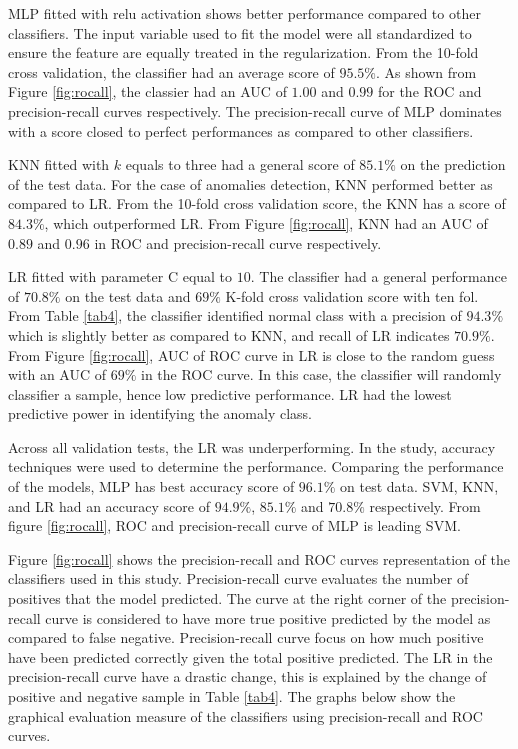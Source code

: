 \documentclass[final,5p,times,twocolumn,authoryear]{elsarticle}
\begin{document}
MLP fitted with relu activation shows better performance compared to other classifiers. The input variable used to fit the model were all standardized to ensure the feature are equally treated in the regularization. From the  10-fold cross validation, the classifier had an average score of $95.5\%$. As shown from Figure \ref{fig:rocall}, the classier had an AUC of $1.00$ and $0.99$ for the ROC and precision-recall curves respectively. The precision-recall curve of MLP dominates with a score closed to perfect performances as compared to other classifiers.  

KNN fitted with $k$ equals to three had a general score of $85.1\%$ on the prediction of the test data. For the case of anomalies detection, KNN performed better as compared to LR. From the 10-fold cross validation score, the KNN has a score of $84.3\%$, which outperformed LR. From Figure \ref{fig:rocall}, KNN had an AUC of $0.89$ and $0.96$ in ROC and precision-recall curve respectively. 

LR fitted with parameter  C equal to $10$. The classifier had a general performance of $70.8\%$ on the test data and $69\%$ K-fold cross validation score with ten fol. From Table \ref{tab4}, the classifier identified normal class with a precision of $94.3\%$ which is slightly better as compared to KNN, and recall of LR indicates  $70.9\% $. From Figure \ref{fig:rocall},  AUC of ROC curve in LR is close to the random guess with an AUC of $69\%$ in the ROC curve. In this case, the classifier will randomly classifier a sample, hence low predictive performance. LR had the lowest predictive power in identifying the anomaly class.

Across all validation tests, the LR was underperforming. In the study, accuracy techniques were used to determine the performance. Comparing the performance of the models, MLP has best accuracy score of $96.1\%$ on test data. SVM, KNN, and LR had an accuracy score of $94.9\%$, $85.1\%$ and $70.8\%$ respectively. From figure \ref{fig:rocall}, ROC and precision-recall curve of MLP is leading SVM. 

Figure \ref{fig:rocall} shows the precision-recall and ROC curves representation of the classifiers used in this study. Precision-recall curve evaluates the number of positives that the model predicted. The curve at the right corner of the precision-recall curve is considered to have more true positive predicted by the model as compared to false negative. Precision-recall curve focus on how much positive have been predicted correctly given the total positive predicted. The LR in the precision-recall curve have a drastic change, this is explained by the change of positive and negative sample in Table \ref{tab4}. The graphs below show the graphical evaluation measure of the classifiers using precision-recall and ROC curves.  
\end{document}
